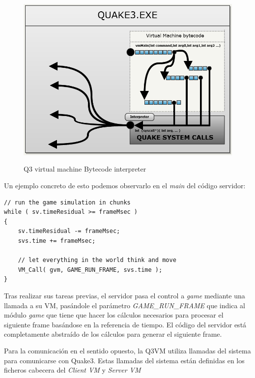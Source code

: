 \documentclass[a4paper,12pt]{report}
\begin{document}
	\begin{center}
		\begin{figure}[h]
			\includegraphics[width=1\textwidth]{images/vm_bb}
			\label{fig:q3vm_bb}
			\caption{Q3 virtual machine Bytecode interpreter}
		\end{figure}
	\end{center}

	Un ejemplo concreto de esto podemos observarlo en el \textit{main} del código servidor:
	
		\begin{lstlisting}[style=C, numbers=none]
// run the game simulation in chunks
while ( sv.timeResidual >= frameMsec ) 
{
	sv.timeResidual -= frameMsec;
	svs.time += frameMsec;
	
	// let everything in the world think and move
	VM_Call( gvm, GAME_RUN_FRAME, svs.time );
}
	\end{lstlisting}
	
	Tras realizar sus tareas previas, el servidor pasa el control a \textit{game} mediante una llamada a su VM, pasándole el parámetro \textit{GAME\_RUN\_FRAME} que indica al módulo \textit{game} que tiene que hacer los cálculos necesarios para procesar el siguiente frame basándose en la referencia de tiempo. El código del servidor está completamente abstraído de los cálculos para generar el siguiente frame.\\
	 \cite{q3vmcallex}

	Para la comunicación en el sentido opuesto, la Q3VM utiliza llamadas del sistema para comunicarse con Quake3. Estas llamadas del sistema están definidas en los ficheros cabecera del \textit{Client VM}\cite{q3vmclient} y \textit{Server VM}\cite{q3vmserver}\\
	
\end{document}
